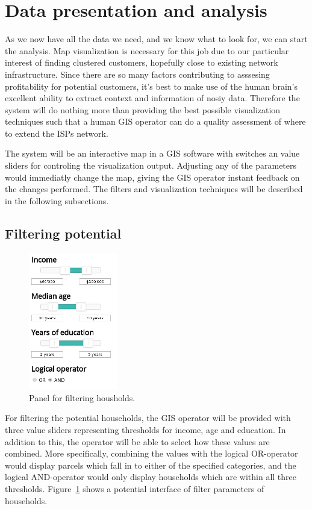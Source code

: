 \documentclass[twocolumn]{article}
\begin{document}
\section{Data presentation and analysis}
\label{sec:Methods}
As we now have all the data we need, and we know what to look for, we can start the analysis. Map visualization is necessary for this job due to our particular interest of finding clustered customers, hopefully close to existing network infrastructure. Since there are so many factors contributing to asssesing profitability for potential customers, it's best to make use of the human brain's excellent ability to extract context and information of nosiy data. Therefore the system will do nothing more than providing the best possible visualization techniques such that a human GIS operator can do a quality assessment of where to extend the ISPs network.

The system will be an interactive map in a GIS software with switches an value sliders for controling the visualization output. Adjusting any of the parameters would immediatly change the map, giving the GIS operator instant feedback on the changes performed. The filters and visualization techniques will be described in the following subsections.

\subsection{Filtering potential}
\label{sub:Filtering potential}
\begin{figure}
  \centering
  \includegraphics[width=0.35\textwidth]{img/household.png}
  \caption{Panel for filtering housholds.}
  \label{fig:household}
\end{figure}
For filtering the potential households, the GIS operator will be provided with three value sliders representing thresholds for income, age and education. In addition to this, the operator will be able to select how these values are combined. More specifically, combining the values with the logical OR-operator would display parcels which fall in to either of the specified categories, and the logical AND-operator would only display households which are within all three thresholds. Figure~\ref{fig:household} shows a potential interface of filter parameters of households.
\end{document}
